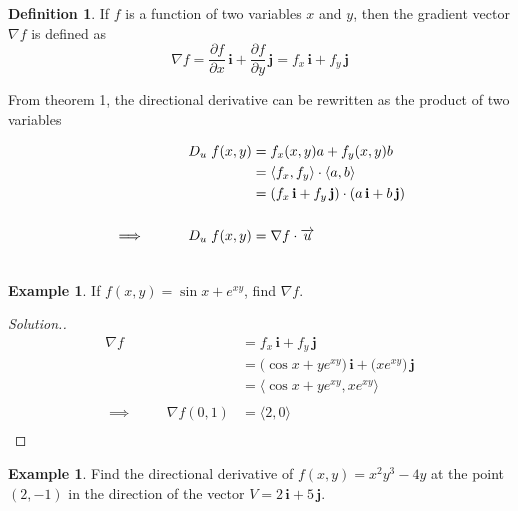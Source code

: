 \documentclass[11pt,a4paper]{article}
\theoremstyle{definition}
\newtheorem{defn}[thm]{Definition}
\newtheorem{exa}[thm]{Example}
\newenvironment{solution}
  {\renewcommand{\qedsymbol}{}\begin{proof}[\textit{Solution}.]}
  {\end{proof}}
\begin{document}
\begin{defn}


If $f$ is a function of two variables $x$ and $y$, then the gradient vector $\nabla f$ is defined as 
$$\nabla f = \frac{\partial f}{\partial x}\,\textbf{i} +\frac{\partial f}{\partial y}\,\textbf{j} = f_x\, \textbf{i} + f_y\,\textbf{j} $$

From theorem 1, the directional derivative can be rewritten as the product of two variables

\begin{align*}
D_u\hspace{0.1cm}f(x,y) & = f_x(x,y) a + f_y (x,y) b\\
& = \langle f_x , f_y\rangle \cdot \langle a,b\rangle\\
& = (f_x\,\textbf{i} + f_y\,\textbf{j}) \cdot (a\,\textbf{i} + b\,\textbf{j})\\\\
\implies \hspace{1cm} D_u\hspace{0.1cm}f(x,y) & = \nabla f\cdot\overrightarrow{u}\\\\
\end{align*}
\end{defn}

\begin{exa}


If $\displaystyle{f(x,y) = \sin x + e^{xy}}$, find $\nabla f$.
\end{exa}


\begin{solution}
\begin{align*}
\nabla f & = f_x\,\textbf{i} + f_y\, \textbf{j}\\
& = \big(\cos x + ye^{xy}\big)\,\textbf{i} + \big(xe^{xy}\big)\,\textbf{j}\\
& = \langle \cos x + ye^{xy}, xe^{xy}\rangle\\\\
\implies\hspace{1cm} \nabla f (0,1) & = \langle 2,0\rangle\\
\end{align*}
\end{solution}

\begin{exa}


Find the directional derivative of $f(x,y) = x^2y^3 -4y$ at the  point $(2,-1)$ in the  direction of the vector $V = 2\,\textbf{i} + 5\,\textbf{j}$.
\end{exa}
\end{document}
